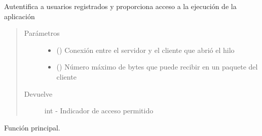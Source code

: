 \documentclass[letterpaper,10pt,spanish,openany,oneside]{sphinxmanual}
\begin{document}
\begin{fulllineitems}
\label{\detokenize{pokemonServer:pokemonServer.giveAccess}}
Autentifica a usuarios registrados y proporciona acceso a la ejecución de la aplicación
\begin{quote}\begin{description}
\item[{Parámetros}] \leavevmode\begin{itemize}
\item {} 
 () \textendash{} Conexión entre el servidor y el cliente que abrió el hilo

\item {} 
 () \textendash{} Número máximo de bytes que puede recibir en un paquete del cliente

\end{itemize}

\item[{Devuelve}] \leavevmode
int - Indicador de acceso permitido

\end{description}\end{quote}

\end{fulllineitems}


\begin{fulllineitems}
\label{\detokenize{pokemonServer:pokemonServer.main}}
Función principal.

\end{fulllineitems}

\end{document}

